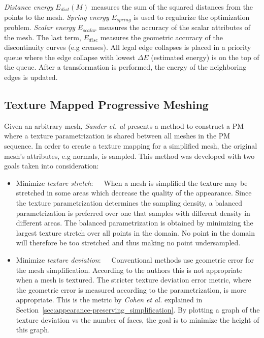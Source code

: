 \emph{Distance energy} $E_{dist}(M)$ measures the sum of the squared distances from the points to the mesh. \emph{Spring energy} $E_{spring}$ is used to regularize the optimization problem. \emph{Scalar energy} $E_{scalar}$ measures the accuracy of the scalar attributes of the mesh. The last term, $E_{disc}$ measures the geometric accuracy of the discontinuity curves (e.g creases). All legal edge collapses is placed in a priority queue where the edge collapse with lowest $\Delta E$ (estimated energy) is on the top of the queue. After a transformation is performed, the energy of the neighboring edges is updated.


\subsection{Texture Mapped Progressive Meshing} \label{sec:texture_mapped_progressive_meshing}
Given an arbitrary mesh, \emph{Sander et. al} \cite{sander2001texture} presents a method to construct a PM where a texture parametrization is shared between all meshes in the PM sequence. In order to create a texture mapping for a simplified mesh, the original mesh's attributes, e.g normals, is sampled. This method was developed with two goals taken into consideration:
\begin{itemize}
\item{Minimize \emph{texture stretch}:}~~~When a mesh is simplified the texture may be stretched in some areas which decrease the quality of the appearance. Since the texture parametrization determines the sampling density, a balanced parametrization is preferred over one that samples with different density in different areas. The balanced parametrization is obtained by minimizing the largest texture stretch over all points in the domain. No point in the domain will therefore be too stretched and thus making no point undersampled. 
\item{Minimize \emph{texture deviation}:}~~~Conventional methods use geometric error for the mesh simplification. According to the authors this is not appropriate when a mesh is textured. The stricter texture deviation error metric, where the geometric error is measured according to the parametrization, is more appropriate. This is the metric by \emph{Cohen et al.} \cite{cohen1998appearance} explained in Section~\ref{sec:appearance-preserving_simplification}. By plotting a graph of the texture deviation vs the number of faces, the goal is to minimize the height of this graph.
\end{itemize}

